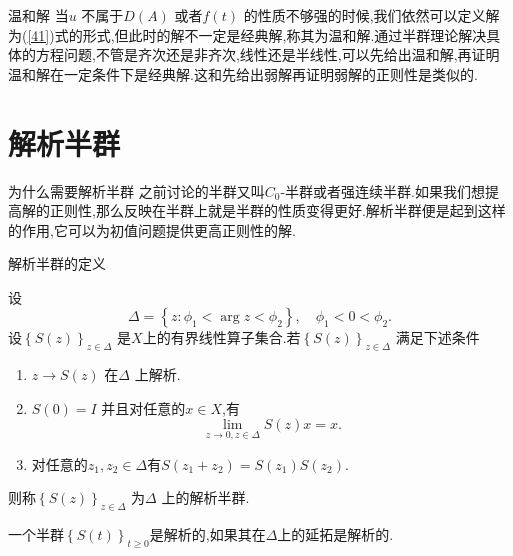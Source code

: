 \begin{frame}{温和解}
  当$u$ 不属于$D(A)$ 或者$f(t)$ 的性质不够强的时候,我们依然可以定义解为(\ref{41})式的形式,但此时的解不一定是经典解,称其为温和解.通过半群理论解决具体的方程问题,不管是齐次还是非齐次,线性还是半线性,可以先给出温和解,再证明温和解在一定条件下是经典解.这和先给出弱解再证明弱解的正则性是类似的.
\end{frame}

\section{解析半群}
\begin{frame}{为什么需要解析半群}
之前讨论的半群又叫$C_0$-半群或者强连续半群.如果我们想提高解的正则性,那么反映在半群上就是半群的性质变得更好.解析半群便是起到这样的作用,它可以为初值问题提供更高正则性的解.
\end{frame}

\begin{frame}[t]{解析半群的定义}
  \begin{definition}
    设
    \[
    \Delta = \left\{z: \phi_1<\arg z <\phi_2\right\},\quad \phi_1<0<\phi_2. 
    \]
    设$\left\{S(z)\right\}_{z\in \Delta} $ 是$X$上的有界线性算子集合.若$\left\{S(z)\right\} _{z\in \Delta}$ 满足下述条件
    \begin{enumerate}
      \item $z\to S(z)$ 在$\Delta$ 上解析.
      \item $S(0)=I$ 并且对任意的$x\in X$,有
	\[
	  \lim_{z\to 0,z\in \Delta}S(z)x=x.
	\] 
      \item 对任意的$z_1,z_2\in \Delta$有$S(z_1+z_2)=S(z_1)S(z_2)$.
    \end{enumerate}
    则称$\left\{S(z)\right\} _{z\in \Delta}$ 为$\Delta$ 上的解析半群.
  \end{definition}
  一个半群$\left\{S(t)\right\} _{t\ge 0}$是解析的,如果其在$\Delta$上的延拓是解析的.
\end{frame}


